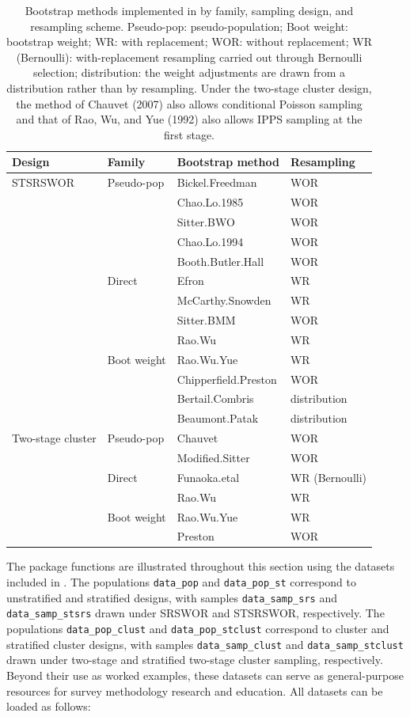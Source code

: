 \begin{table}

\caption{\label{tab:tab-methods}Bootstrap methods implemented in  by family, sampling design, and resampling scheme. Pseudo-pop: pseudo-population; Boot weight: bootstrap weight; WR: with replacement; WOR: without replacement; WR (Bernoulli): with-replacement resampling carried out through Bernoulli selection; distribution: the weight adjustments are drawn from a distribution rather than by resampling. Under the two-stage cluster design, the method of Chauvet (2007) also allows conditional Poisson sampling and that of Rao, Wu, and Yue (1992) also allows IPPS sampling at the first stage.}
\centering
\begin{tabular}[t]{llll}
\toprule
Design & Family & Bootstrap method & Resampling\\
\midrule
STSRSWOR & Pseudo-pop & Bickel.Freedman & WOR\\
 &  & Chao.Lo.1985 & WOR\\
 &  & Sitter.BWO & WOR\\
 &  & Chao.Lo.1994 & WOR\\
 &  & Booth.Butler.Hall & WOR\\
\addlinespace
 & Direct & Efron & WR\\
 &  & McCarthy.Snowden & WR\\
 &  & Sitter.BMM & WOR\\
 &  & Rao.Wu & WR\\
\addlinespace
 & Boot weight & Rao.Wu.Yue & WR\\
 &  & Chipperfield.Preston & WOR\\
 &  & Bertail.Combris & distribution\\
 &  & Beaumont.Patak & distribution\\
\addlinespace
Two-stage cluster & Pseudo-pop & Chauvet & WOR\\
 &  & Modified.Sitter & WOR\\
\addlinespace
 & Direct & Funaoka.etal & WR (Bernoulli)\\
 &  & Rao.Wu & WR\\
\addlinespace
 & Boot weight & Rao.Wu.Yue & WR\\
 &  & Preston & WOR\\
\bottomrule
\end{tabular}
\end{table}

The package functions are illustrated throughout this section using the datasets included in . The populations \texttt{data\_pop} and \texttt{data\_pop\_st} correspond to unstratified and stratified designs, with samples \texttt{data\_samp\_srs} and \texttt{data\_samp\_stsrs} drawn under SRSWOR and STSRSWOR, respectively. The populations \texttt{data\_pop\_clust} and \texttt{data\_pop\_stclust} correspond to cluster and stratified cluster designs, with samples \texttt{data\_samp\_clust} and \texttt{data\_samp\_stclust} drawn under two-stage and stratified two-stage cluster sampling, respectively. Beyond their use as worked examples, these datasets can serve as general-purpose resources for survey methodology research and education. All datasets can be loaded as follows:


